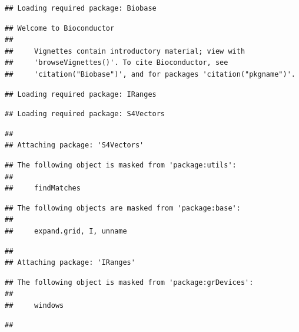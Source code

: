 \documentclass[
]{article}
\begin{document}
\begin{verbatim}
## Loading required package: Biobase
\end{verbatim}

\begin{verbatim}
## Welcome to Bioconductor
## 
##     Vignettes contain introductory material; view with
##     'browseVignettes()'. To cite Bioconductor, see
##     'citation("Biobase")', and for packages 'citation("pkgname")'.
\end{verbatim}

\begin{verbatim}
## Loading required package: IRanges
\end{verbatim}

\begin{verbatim}
## Loading required package: S4Vectors
\end{verbatim}

\begin{verbatim}
## 
## Attaching package: 'S4Vectors'
\end{verbatim}

\begin{verbatim}
## The following object is masked from 'package:utils':
## 
##     findMatches
\end{verbatim}

\begin{verbatim}
## The following objects are masked from 'package:base':
## 
##     expand.grid, I, unname
\end{verbatim}

\begin{verbatim}
## 
## Attaching package: 'IRanges'
\end{verbatim}

\begin{verbatim}
## The following object is masked from 'package:grDevices':
## 
##     windows
\end{verbatim}

\begin{verbatim}
## 
\end{verbatim}
\end{document}
